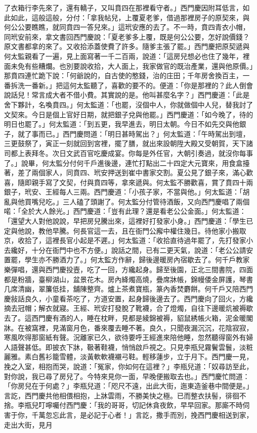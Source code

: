 \begin{showcontents}{}
了衣箱行李先來了，還有轎子，又叫賁四在那裡看守者。」西門慶因附耳低言，如此如此，這般這般，分付：「拿我帖兒，上覆夏老爹，借過那裡房子的原契來，與何公公要瞧瞧，就同賁四一答兒來。」這玳安應的去了。不一時，賁四青衣小帽，同玳安前來，拿文書回西門慶說：「夏老爹多上覆，既是何公公要，怎好說價錢？原文書都拿的來了。又收拾添蓋使費了許多。隨爹主張了罷。」西門慶把原契遞與何太監親看了一遍，見上面寫著一千二百兩，說道：「這房兒想必也住了幾年，裡面未免有些糟爛。也別要說收拾，大人面上，我家做官的既治產業，還與他原價。」那賁四連忙跪下說：「何爺說的，自古使的憨錢，治的庄田；千年房舍換百主，一番拆洗一番新。」把這何太監聽了，喜歡的要不的。便道：「你是那裡的？此人倒會說話兒！常言成大者不借小費。其實說的是。他叫甚麼名字？」西門慶道：「此是舍下夥計，名喚賁四。」何太監道：「也罷，沒個中人，你就做個中人兒，替我討了文契來。今日是個上官好日期，就把銀子兌與他罷。」西門慶道：「如今晚了，待的明日也罷了。」何太監道：「到五更，我早進去，明日太朝。今日不如先交與他銀子，就了事而已。」西門慶問道：「明日甚時駕出？」何太監道：「午時駕出到壇，三更鼓祭了，寅正一刻就回到宮裡，擺了膳，就出來設朝陞大殿又受朝賀，天下諸司都上表拜冬。次日文武百官吃慶成宴。你每是外任官，大朝引奏過，就沒你每事了。」說畢，何太監分付何千戶進後邊，連忙打點出二十四定大元寶來，用食盒擡著，差了兩個家人，同賁四、玳安押送到崔中書家交割。夏公見了銀子來，滿心歡喜，隨即親手寫了文契，付與賁四等，拿來遞與。何太監不勝歡喜，賞了賁四十兩銀子，玳安、王經每人三兩。西門慶道：「小孩子家，不當與他。」何太監道：「胡亂與他買嘴兒吃。」三人磕了頭謝了。何太監分付管待酒飯，又向西門慶唱了兩個喏：「全於大人餘光。」西門慶道：「豈有此理？還是看老公公金面。」何太監道：「還望大人對他說說，早把房兒騰出來，這裡好打發家小身。」西門慶道：「學生已定與他說，教他早騰。何長官這一去，且在衙門公廨中權住幾日。待他家小搬取京，收拾了，這裡長官小起是不遲。」何太監道：「收拾直待過年罷了，先打發家小去纔好，十分在衙門中也不方便。」說話之間，已有二更天氣，說道：「老公公請安置罷，學生亦不勝酒力了。」何太監方作辭，歸後邊暖房內宿歇去了。何千戶教家樂彈唱，還與西門慶投壼，吃了一回，方纔起身。歸至後園，正北三間書院，四面都是粉牆，臺柳湖山，盆景花木。房內絳燭高燒，疊席牀帳，錦幔倭金屏護，琴書几席清幽，翠簾低挂，舖陳整齊。爐上茶煮寶瓶，篆內香焚麝餅。何千戶又陪西門慶敍話良久，小童看茶吃了，方道安置，起身歸後邊去了。西門慶向了回火，方纔摘去冠帽；解衣就寢。王經、玳安打發脫了靴襪，合了燈燭，自往下邊暖炕被褥歇去了。這西門慶有酒的人，睡在枕畔，見都是綾錦被褥，貂鼠綉帳火箱，泥金暖閣牀。在被窩裡，見滿窗月色，番來覆去睡不著。良久，只聞夜漏沉沉，花陰寂寂，寒風吹得那窗紙有聲。況離家已久，欲待要呼王經進來陪他睡，忽然聽得窗外有婦人語聲甚低。即披衣下牀，靸著鞋襪，悄悄啟戶視之。只見李瓶兒霧鬢雲鬟，淡粧麗雅。素白舊衫籠雪體，淡黃軟軟襪襯弓鞋。輕移蓮步，立于月下。西門慶一見，挽之入室，相抱而哭，說道：「冤家，你如何在這裡？」李瓶兒道：「奴尋訪至此，對你說，我已尋了房兒了。今特來見你一面，早晚便搬取去也。」西門慶忙問道：「你房兒在于何處？」李瓶兒道：「咫尺不遠，出此大街，迤東造釜巷中間便是。」言訖，西門慶共他相偎相抱，上牀雲雨，不勝美快之極。已而整衣扶髻，徘徊不捨。李瓶兒叮嚀囑付西門慶：「我的哥哥，切記休貪夜飲，早早回家。那廝不時伺害于你，千萬忽忘此言，是必記于心者！」言訖，撒手而別，挽西門慶相送到家，走出大街，見月
\end{showcontents}
